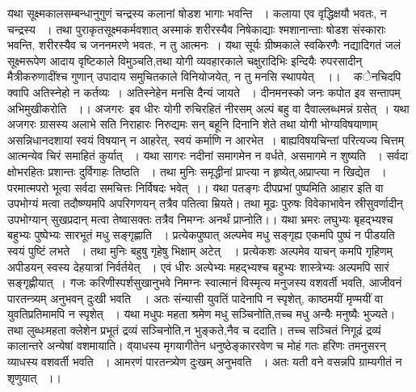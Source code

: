 {{{{\fontsize{14}{16}\selectfont \v  यथा सूक्ष्मकालसम्बन्धानुगुणं चन्द्रस्य कलानां षोडश भागाः भवन्ति ~। कलाया एव वृद्धिक्षयौ भवतः, न चन्द्रस्य ~। तथा पुराकृतसूक्ष्मकर्मवशात् अस्माकं शरीरस्यैव निषेकाद्याः श्मशानान्ताः षोडश संस्काराः भवन्ति, शरीरस्यैव च जननमरणे भवतः, न तु आत्मनः~।}
{\fontsize{14}{16}\selectfont \v  यथा सूर्यः ग्रीष्मकाले स्वकिरणैः नद्यादिगतं जलं सूक्ष्मरूपेण आदाय वृष्टिकाले विमुञ्चति,तथा योगी व्यवहारकाले चक्षुरादिभिः इन्दियैः रुपरसादीन् मैत्रीकरुणादींश्च गुणान् उपादाय समुचितकाले विनियोजयेत्, न तु मनसि स्थापयेत्~~।। \footB \ }
{\fontsize{14}{16}\selectfont \v  केनचिदपि क्वापि अतिस्नेहो न कर्तव्यः~। अतिस्नेहेन मनसि दैन्यं जायते ~। दीनमनस्को जनः कपोत इव सन्तापम् अभिमुखीकरोति ~।।
{\fontsize{14}{16}\selectfont \v  अजगरः\footB \   इव धीरः योगी रुचिरहितं नीरसम् अल्पं बहु वा दैवाल्लब्धमन्नं ग्रसेत्~। यथा अजगरः ग्रासस्य अलाभे सति निराहारः निरुद्यमः सन् बहूनि दिनानि शेते  तथा योगी भोग्यविषयाणाम् असन्निधानदशायां स्वयं विषयान् न आहरेत्, स्वयं कर्माणि न आरभेत~। बाह्यविषयचिन्तां परित्यज्य चित्तम् आत्मन्येव चिरं समाहितं कुर्यात् ~।}
{\fontsize{14}{16}\selectfont \v  यथा सागरः नदीनां समागमेन न वर्धते, असमागमे न शुष्यति ~। सर्वदा क्षोभरहितः प्रशान्तः दुर्विगाहः तिष्ठति ~। तथा मुनिः समृद्धीनां प्राप्त्या न हृष्येत्,अप्राप्त्या न खिद्येत ~। परमात्मपरो भूत्वा सर्वदा समचित्तः निर्विषदः भवेत्~।।}
{\fontsize{14}{16}\selectfont \v  यथा पतङ्गः दीपप्रभां पुष्पमिति आहार इति वा उपभोग्यं मत्वा तदौष्ण्यमपि अपरिगणयन् तत्रैव पतित्वा म्रियते। तथा मूढः पुरुषः विवेकाभावेन स्रीसुवर्णादीन् उपभोग्यान् सुखप्रदान् मत्वा तेष्वासक्तः तत्रैव निमग्नः अनर्थं प्राप्नोति।।}
{\fontsize{14}{16}\selectfont \v  यथा भ्रमरः लघुभ्यः बृहद्भ्यश्च बहुभ्यः पुष्पेभ्यः सारभूतं मधु सङ्गृह्णाति ~। प्रत्येकपुष्पात् अल्पमेव मधु सङ्गृह्य एकमपि पुष्पं न पीडयति स्वयं पुष्टिं लभते ~। तथा मुनिः बहुषु गृहेषु भिक्षाम् अटेत्~~। प्रत्येकशः अल्पमेव  याचन् कमपि गृहिणम् अपीडयन् स्वस्य देहयात्रां निर्वर्तयेत् ~। एवं धीरः अल्पेभ्यः महद्भ्यश्च बहुभ्यः शास्त्रेभ्यः अल्पमपि सारं सङ्गृह्णीयात्~।}
{\fontsize{14}{16}\selectfont \v  गजः करिणीस्पर्शसुखानुभवे निमग्नः स्वात्मानं विस्मृत्य मनुजस्य वशवर्ती भवति, आजीवनं पारतन्त्र्यम् अनुभवन् दुःखी भवति~~। अतः संन्यासी युवतिं पादेनापि न स्पृशेत्, काष्ठमयीं मृण्मयीं वा युवतिप्रतिमामपि न स्पृशेत् ~।}
{\fontsize{14}{16}\selectfont \v  यथा मधुपः महता श्रमेण मधु सञ्चिनोति,तच्च मधु अन्यैः मनुष्यैः भुज्यते। तथा लुब्धःमहता क्लेशेन प्रभूतं द्रव्यं सञ्चिनोति,न भुङ्कते,नैव च ददाति। तच्च सञ्चितं निगूढं द्रव्यं कालान्तरे अन्येषां वशमायाति।}
{\fontsize{14}{16}\selectfont \v  व्याधस्य मृगयागीतेन धनुष्ठेङ्काररवेण च मोहं गतः हरिणः तमनुसरन् व्याधस्य वशवर्ती भवति ~। आमरणं पारतन्त्र्येण दुःखम् अनुभवति ~। अतः यती वने वसन्नपि ग्राम्यगीतं न शृणुयात् ~।।}
}}}}
